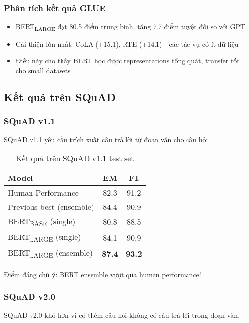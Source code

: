 \subsubsection{Phân tích kết quả GLUE}
\begin{itemize}
    \item BERT\textsubscript{LARGE} đạt 80.5 điểm trung bình, tăng 7.7 điểm tuyệt đối so với GPT
    \item Cải thiện lớn nhất: CoLA (+15.1), RTE (+14.1) - các tác vụ có ít dữ liệu
    \item Điều này cho thấy BERT học được representations tổng quát, transfer tốt cho small datasets
\end{itemize}

\subsection{Kết quả trên SQuAD}
\label{ssec:ket_qua_squad}

\subsubsection{SQuAD v1.1}
SQuAD v1.1 yêu cầu trích xuất câu trả lời từ đoạn văn cho câu hỏi.

\begin{table}[H]
    \centering
    \caption{Kết quả trên SQuAD v1.1 test set}
    \label{tab:squad_v1_results}
    \begin{tabular}{lcc}
        \toprule
        \textbf{Model} & \textbf{EM} & \textbf{F1} \\
        \midrule
        Human Performance & 82.3 & 91.2 \\
        Previous best (ensemble) & 84.4 & 90.9 \\
        \midrule
        BERT\textsubscript{BASE} (single) & 80.8 & 88.5 \\
        BERT\textsubscript{LARGE} (single) & 84.1 & 90.9 \\
        BERT\textsubscript{LARGE} (ensemble) & \textbf{87.4} & \textbf{93.2} \\
        \bottomrule
    \end{tabular}
\end{table}

Điểm đáng chú ý: BERT ensemble vượt qua human performance!

\subsubsection{SQuAD v2.0}
SQuAD v2.0 khó hơn vì có thêm câu hỏi không có câu trả lời trong đoạn văn.

